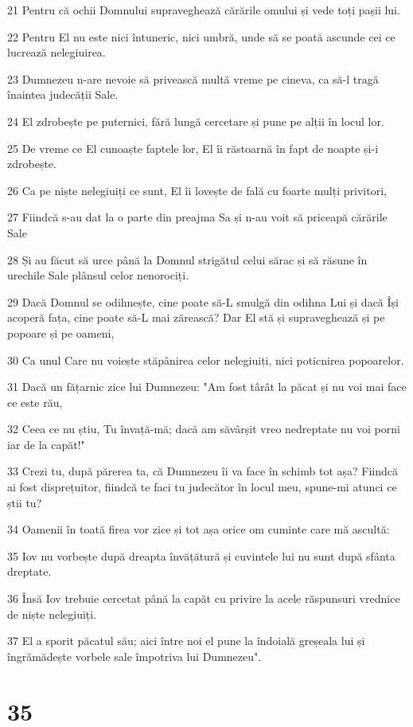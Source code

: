 \par 21 Pentru că ochii Domnului supraveghează cărările omului și vede toți pașii lui.
\par 22 Pentru El nu este nici întuneric, nici umbră, unde să se poată ascunde cei ce lucrează nelegiuirea.
\par 23 Dumnezeu n-are nevoie să privească multă vreme pe cineva, ca să-l tragă înaintea judecății Sale.
\par 24 El zdrobește pe puternici, fără lungă cercetare și pune pe alții în locul lor.
\par 25 De vreme ce El cunoaște faptele lor, El îi răstoarnă în fapt de noapte și-i zdrobește.
\par 26 Ca pe niște nelegiuiți ce sunt, El îi lovește de fală cu foarte mulți privitori,
\par 27 Fiindcă s-au dat la o parte din preajma Sa și n-au voit să priceapă cărările Sale
\par 28 Și au făcut să urce până la Domnul strigătul celui sărac și să răsune în urechile Sale plânsul celor nenorociți.
\par 29 Dacă Domnul se odihnește, cine poate să-L smulgă din odihna Lui și dacă Își acoperă fața, cine poate să-L mai zărească? Dar El stă și supraveghează și pe popoare și pe oameni,
\par 30 Ca unul Care nu voiește stăpânirea celor nelegiuiți, nici poticnirea popoarelor.
\par 31 Dacă un fățarnic zice lui Dumnezeu: "Am fost târât la păcat și nu voi mai face ce este rău,
\par 32 Ceea ce nu știu, Tu învață-mă; dacă am săvârșit vreo nedreptate nu voi porni iar de la capăt!"
\par 33 Crezi tu, după părerea ta, că Dumnezeu îi va face în schimb tot așa? Fiindcă ai fost disprețuitor, fiindcă te faci tu judecător în locul meu, spune-mi atunci ce știi tu?
\par 34 Oamenii în toată firea vor zice și tot așa orice om cuminte care mă ascultă:
\par 35 Iov nu vorbește după dreapta învățătură și cuvintele lui nu sunt după sfânta dreptate.
\par 36 Însă Iov trebuie cercetat până la capăt cu privire la acele răspunsuri vrednice de niște nelegiuiți.
\par 37 El a sporit păcatul său; aici între noi el pune la îndoială greșeala lui și îngrămădește vorbele sale împotriva lui Dumnezeu".

\chapter{35}

